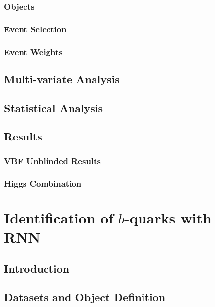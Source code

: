 \documentclass{report}
\begin{document}
\subsection{Objects}

\subsection{Event Selection}

\subsection{Event Weights}

\clearpage

\section{Multi-variate Analysis}

\clearpage

\section{Statistical Analysis}

\clearpage

\section{Results}
\subsection{VBF \Hbb Unblinded Results}

\clearpage
\subsection{Higgs Combination}


\clearpage


\chapter{Identification of $b$-quarks with RNN}
\label{chap:btagging}
\section{Introduction}

\clearpage

\section{Datasets and Object Definition}

\clearpage
\end{document}
